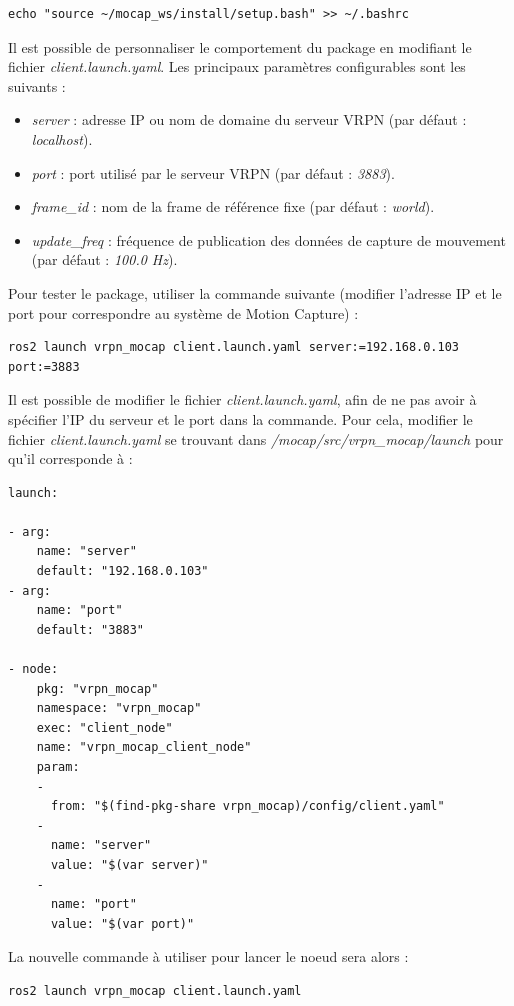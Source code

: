 \begin{lstlisting}[style=commandstyle]
echo "source ~/mocap_ws/install/setup.bash" >> ~/.bashrc
\end{lstlisting}

Il est possible de personnaliser le comportement du package en modifiant le fichier \textit{client.launch.yaml}. Les principaux paramètres configurables sont les suivants :

\begin{itemize}
    \item \textit{server} : adresse IP ou nom de domaine du serveur VRPN (par défaut : \textit{localhost}).
    \item \textit{port} : port utilisé par le serveur VRPN (par défaut : \textit{3883}).
    \item \textit{frame\_id} : nom de la frame de référence fixe (par défaut : \textit{world}).
    \item \textit{update\_freq} : fréquence de publication des données de capture de mouvement (par défaut : \textit{100.0 Hz}).
\end{itemize}

Pour tester le package, utiliser la commande suivante (modifier l'adresse IP et le port pour correspondre au système de Motion Capture) : 
\begin{lstlisting}[style=commandstyle]
ros2 launch vrpn_mocap client.launch.yaml server:=192.168.0.103 port:=3883
\end{lstlisting}

Il est possible de modifier le fichier \textit{client.launch.yaml}, afin de ne pas avoir à spécifier l'IP du serveur et le port dans la commande. Pour cela, modifier le fichier \textit{client.launch.yaml} se trouvant dans \textit{/mocap/src/vrpn\_mocap/launch} pour qu'il corresponde à : 
\begin{lstlisting}[style=commandstyle]
launch:

- arg:
    name: "server"
    default: "192.168.0.103"
- arg:
    name: "port"
    default: "3883"

- node:
    pkg: "vrpn_mocap"
    namespace: "vrpn_mocap"
    exec: "client_node"
    name: "vrpn_mocap_client_node"
    param:
    -
      from: "$(find-pkg-share vrpn_mocap)/config/client.yaml"
    -
      name: "server"
      value: "$(var server)"
    -
      name: "port"
      value: "$(var port)"

\end{lstlisting}

\noindent La nouvelle commande à utiliser pour lancer le noeud sera alors :
\begin{lstlisting}[style=commandstyle]
ros2 launch vrpn_mocap client.launch.yaml
\end{lstlisting}
\label{lancement_mocap}

